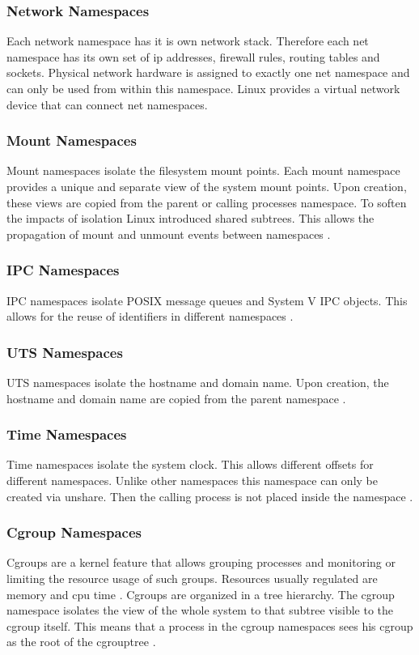 \documentclass[10pt,twocolumn,a4paper]{article}
\begin{document}
\subsubsection{Network Namespaces}
Each network namespace has it is own network stack. Therefore each net namespace has its own set of ip
addresses, firewall rules, routing tables and sockets. Physical network hardware is assigned to exactly one
net namespace and can only be used from within this namespace. Linux provides a virtual network
device that can connect net namespaces\cite{10}.

\subsubsection{Mount Namespaces}
Mount namespaces isolate the filesystem mount points. 
Each mount namespace provides a unique and separate view of the system mount points. 
Upon creation, these views are copied from the parent or calling processes namespace.
To soften the impacts of isolation Linux introduced shared subtrees. This allows the propagation of
mount and unmount events between namespaces \cite{12}.

\subsubsection{IPC Namespaces}
IPC namespaces isolate POSIX message queues and System V IPC objects. This allows for the reuse of identifiers
in different namespaces \cite{13}.

\subsubsection{UTS Namespaces}
UTS namespaces isolate the hostname and domain name. Upon creation, the hostname and domain name
are copied from the parent namespace \cite{14}.

\subsubsection{Time Namespaces}
Time namespaces isolate the system clock. This allows different offsets for different namespaces.
Unlike other namespaces this namespace can only be created via unshare. 
Then the calling process is not placed inside the namespace \cite{15}.

\subsubsection{Cgroup Namespaces}
Cgroups are a kernel feature that allows grouping processes and monitoring or limiting the resource usage
of such groups.
Resources usually regulated are memory and cpu time \cite{16}.
Cgroups are organized in a tree hierarchy. 
The cgroup namespace isolates the view of the whole system to that subtree visible to the cgroup itself. 
This means that a process in the cgroup namespaces sees his cgroup as the root of the cgrouptree \cite{17}.
\end{document}
